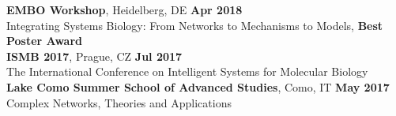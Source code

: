 \documentclass[margin,line]{resume}
\begin{document}
\begin{resume}
   \textbf{EMBO Workshop}, Heidelberg, DE  \hfill \textbf{Apr 2018}\\
   Integrating Systems Biology: From Networks to Mechanisms to Models, \textbf{Best Poster Award} \vspace{1mm}\\
    \textbf{ISMB 2017}, Prague, CZ  \hfill \textbf{Jul 2017}\\
    The International Conference on Intelligent Systems for Molecular Biology  \vspace{1mm}\\
       \textbf{Lake Como Summer School of Advanced Studies}, Como, IT  \hfill \textbf{May 2017}\\
       Complex Networks, Theories and Applications \vspace{-2mm} \\

\end{resume}
\end{document}
